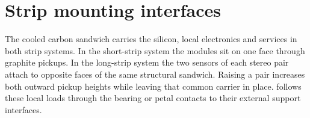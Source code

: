 \section{Strip mounting interfaces}
\label{sec:strip-mounting-interfaces}
The cooled carbon sandwich carries the silicon, local electronics and services
in both strip systems. In the short-strip system the modules sit on one face
through graphite pickups. In the long-strip system the two sensors of each
stereo pair attach to opposite faces of the same structural sandwich. Raising
a pair increases both outward pickup heights while leaving that common carrier
in place.  follows these local loads through
the bearing or petal contacts to their external support interfaces.

